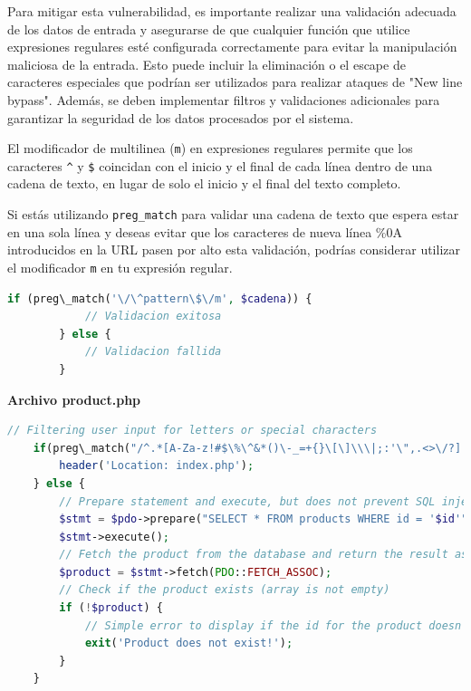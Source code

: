 \documentclass[a4paper]{article} %
\begin{document}
    Para mitigar esta vulnerabilidad, es importante realizar una validación adecuada de los datos de entrada y asegurarse de que cualquier función que utilice expresiones regulares esté configurada correctamente para evitar la manipulación maliciosa de la entrada. Esto puede incluir la eliminación o el escape de caracteres especiales que podrían ser utilizados para realizar ataques de "New line bypass". Además, se deben implementar filtros y validaciones adicionales para garantizar la seguridad de los datos procesados por el sistema.

    El modificador de multilinea (\texttt{m}) en expresiones regulares permite que los caracteres \texttt{\^} y \texttt{\$} coincidan con el inicio y el final de cada línea dentro de una cadena de texto, en lugar de solo el inicio y el final del texto completo.

    Si estás utilizando \texttt{preg\_match} para validar una cadena de texto que espera estar en una sola línea y deseas evitar que los caracteres de nueva línea \%0A introducidos en la URL pasen por alto esta validación, podrías considerar utilizar el modificador \texttt{m} en tu expresión regular.

    \vspace{0.3cm}

    \begin{lstlisting}[language=php, caption={Ejemplo de uso del modificador de multilinea}]
        if (preg\_match('\/\^pattern\$\/m', $cadena)) {
            // Validacion exitosa
        } else {
            // Validacion fallida
        }
    \end{lstlisting}
    \clearpage

    \textbf{Archivo product.php}
    \begin{lstlisting}[language=php, caption={Modificación de la expresion regular utilizando el modificador multilinea}]
    // Filtering user input for letters or special characters
    if(preg\_match("/^.*[A-Za-z!#$\%\^&*()\-_=+{}\[\]\\\|;:'\",.<>\/?]|[^0-9]$/m", $id, $match)) {
        header('Location: index.php');
    } else {
        // Prepare statement and execute, but does not prevent SQL injection
        $stmt = $pdo->prepare("SELECT * FROM products WHERE id = '$id'");
        $stmt->execute();
        // Fetch the product from the database and return the result as an Array
        $product = $stmt->fetch(PDO::FETCH_ASSOC);
        // Check if the product exists (array is not empty)
        if (!$product) {
            // Simple error to display if the id for the product doesn't exists (array is empty)
            exit('Product does not exist!');
        }
    }
    \end{lstlisting}
\end{document}
